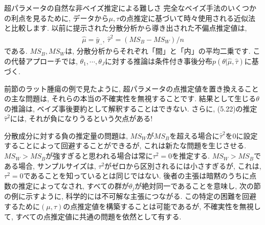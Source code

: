 \documentclass[10pt,dvipdfmx,a4]{beamer}
\newcommand{\eq}[1]{\begin{align}#1\end{align}}
\begin{document}

\begin{frame}{超パラメータの自然な非ベイズ推定による難しさ}
完全なベイズ手法のいくつかの利点を見るために, データから$\mu,\tau$の点推定に基づいて時々使用される近似法と比較します.
以前に提示された分散分析から導き出された不偏点推定値は,
\eq{\hat{\mu}=\bar{y}_{..},\ \hat{\tau}^2=(MS_B-MS_W)/n}
である.
$MS_B, MS_W$は, 分散分析からそれぞれ「間」と「内」の平均二乗です.
この代替アプローチでは, $\theta_1,\cdots,\theta_J$に対する推論は条件付き事後分布$p(\theta|\hat{\mu},\hat{\tau})$に基づく.

前節のラット腫瘍の例で見たように, 超パラメータの点推定値を置き換えることの主な問題は, それらの本当の不確実性を無視することです.
結果として生じる$\theta$の推論は, ベイズ事後要約として解釈することはできない.
さらに, (5.22)の推定$\hat{\tau}^2$には, それが負になりうるという欠点がある!
\end{frame}


\begin{frame}
分散成分に対する負の推定量の問題は, $MS_W$が$MS_B$を超える場合に$\hat{\tau}^2$を0に設定することによって回避することができるが, これは新たな問題を生じさせる.
$MS_W>MS_B$が強すぎると思われる場合は常に$\tau^2 =0$を推定する.
$MS_W>MS_B$である場合, サンプルサイズは, $\tau^2$がゼロから区別されるには小さすぎるが, これは, $\tau^2=0$であることを知っているとは同じではない.
後者の主張は暗黙のうちに点数の推定によってなされ, すべての群が$\theta_j$が絶対同一であることを意味し, 次の節の例に示すように, 科学的には不可解な主張につながる.
この特定の困難を回避するために$(\mu,\tau)$の点推定値を構築することは可能であるが, 不確実性を無視して, すべての点推定値に共通の問題を依然として有する.
\end{frame}

\end{document}

